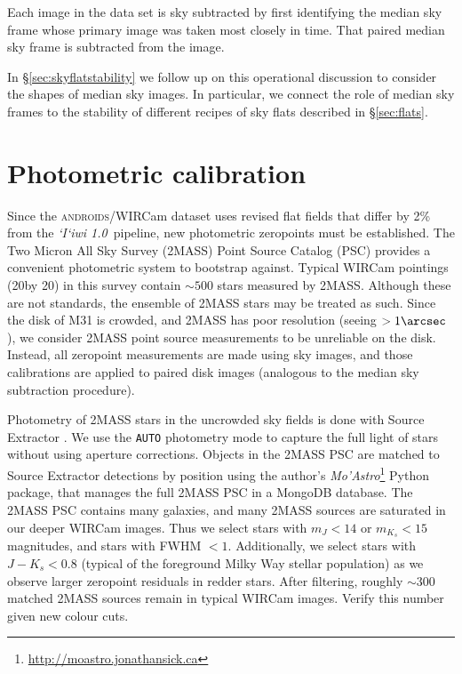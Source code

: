 \documentclass[iop]{emulateapj}
\newcommand{\sw}[1]{\textit{#1}} %
\newcommand{\iiwione}{\sw{`I`iwi 1.0}}
\newcommand{\androids}{\textsc{androids}}
\newcommand{\todo}[1]{\textcolor{BurntOrange}{\textsf{#1}}} %
\newcommand{\Sec}[1]{\S\ref{sec:#1}}  %
\begin{document}
Each image in the data set is sky subtracted by first identifying the median sky frame whose primary image was taken most closely in time.
That paired median sky frame is subtracted from the image.

In \Sec{skyflatstability} we follow up on this operational discussion to consider the shapes of median sky images. In particular, we connect the role of median sky frames to the stability of different recipes of sky flats described in \Sec{flats}.

\section{Photometric calibration}
\label{sec:photocal}

Since the \androids/WIRCam dataset uses revised flat fields that differ by 2\% from the \iiwione\ pipeline, new photometric zeropoints must be established.
The Two Micron All Sky Survey (2MASS) Point Source Catalog (PSC) \citep{Skrutskie:2006} provides a convenient photometric system to bootstrap against.
Typical WIRCam pointings (20\arcmin by 20\arcmin) in this survey contain $\sim 500$ stars measured by 2MASS.
Although these are not standards, the ensemble of 2MASS stars may be treated as such.
Since the disk of M31 is crowded, and 2MASS has poor resolution (seeing $> 1\arcsec$), we consider 2MASS point source measurements to be unreliable on the disk.
Instead, all zeropoint measurements are made using sky images, and those calibrations are applied to paired disk images (analogous to the median sky subtraction procedure).

Photometry of 2MASS stars in the uncrowded sky fields is done with Source Extractor \citep{Bertin:1996}.
We use the \texttt{AUTO} photometry mode to capture the full light of stars without using aperture corrections.
Objects in the 2MASS PSC are matched to Source Extractor detections by position using the author's \sw{Mo'Astro}\footnote{\url{http://moastro.jonathansick.ca}} Python package, that manages the full 2MASS PSC in a MongoDB database.
The 2MASS PSC contains many galaxies, and many 2MASS sources are saturated in our deeper WIRCam images.
Thus we select stars with $m_J < 14$ or $m_{K_s} < 15$ magnitudes, and stars with FWHM $<1$\arcsec.
Additionally, we select stars with $J-K_s < 0.8$ (typical of the foreground Milky Way stellar population) as we observe larger zeropoint residuals in redder stars.
After filtering, roughly $\sim 300$ matched 2MASS sources remain in typical WIRCam images.
\todo{Verify this number given new colour cuts}.
\end{document}
